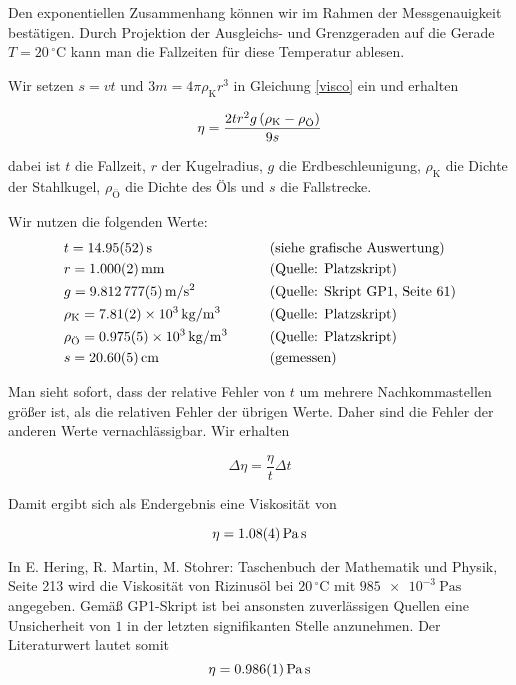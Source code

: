 \documentclass[a4paper,german,12pt,smallheadings]{scrartcl}
\begin{document}
Den exponentiellen Zusammenhang können wir im Rahmen der Messgenauigkeit
bestätigen. Durch Projektion der Ausgleichs- und Grenzgeraden auf die Gerade $T
= 20\,^{\circ} \mathrm{C}$ kann man die Fallzeiten für diese Temperatur
ablesen.

Wir setzen $s = vt$ und $3m = 4 \pi \rho_\text{K} r^3$ in Gleichung \ref{visco}
ein und erhalten

\begin{equation}
  \eta = \frac{2 t r^2 g \del{\rho_\text{K} - \rho_\text{Ö}}}{9 s}
  \label{visco2}
\end{equation}

dabei ist $t$ die Fallzeit, $r$ der Kugelradius, $g$ die Erdbeschleunigung,
$\rho_\text{K}$ die Dichte der Stahlkugel, $\rho_\text{Ö}$ die Dichte des Öls
und $s$ die Fallstrecke.

Wir nutzen die folgenden Werte:
\begin{align*}
  &t = \SI{14.95+-0.52}{s}     && \qquad \text{(siehe grafische Auswertung)} \\
  &r = \SI{1.000+-0.002}{mm} && \qquad \text{(Quelle: Platzskript)} \\
  &g = \SI{9.812777+-0.000005}{m/s^2} && \qquad \text{(Quelle: Skript GP1, Seite 61)} \\
  &\rho_\text{K} = \SI{7.81+-0.02e3}{kg/m^3} && \qquad \text{(Quelle: Platzskript)} \\
  &\rho_\text{Ö} = \SI{0.975+-0.005e3}{kg/m^3} && \qquad \text{(Quelle: Platzskript)} \\
  &s = \SI{20.6+-0.05}{cm} && \qquad \text{(gemessen)}
\end{align*}

Man sieht sofort, dass der relative Fehler von $t$ um mehrere Nachkommastellen
größer ist, als die relativen Fehler der übrigen Werte. Daher sind die Fehler
der anderen Werte vernachlässigbar. Wir erhalten

\begin{equation}
  \Delta \eta = \frac{\eta}{t} \Delta t
\end{equation}

Damit ergibt sich als Endergebnis eine Viskosität von

\begin{equation*}
  \eta = \SI{1.08+-0.04}{\pascal \second}
\end{equation*}

In E. Hering, R. Martin, M. Stohrer: Taschenbuch der Mathematik und Physik,
Seite 213 wird die Viskosität von Rizinusöl bei $20\,^{\circ}\mathrm{C}$ mit
$\SI{985e-3}{\pascal \second}$ angegeben. Gemäß GP1-Skript ist bei ansonsten
zuverlässigen Quellen eine Unsicherheit von $1$ in der letzten signifikanten
Stelle anzunehmen. Der Literaturwert lautet somit
\begin{equation*}
  \eta = \SI{0.986+-0.001}{\pascal \second}
\end{equation*}
\end{document}
